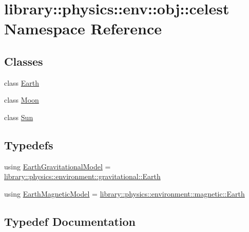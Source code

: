 \hypertarget{namespacelibrary_1_1physics_1_1env_1_1obj_1_1celest}{}\section{library\+:\+:physics\+:\+:env\+:\+:obj\+:\+:celest Namespace Reference}
\label{namespacelibrary_1_1physics_1_1env_1_1obj_1_1celest}
\subsection*{Classes}
\begin{DoxyCompactItemize}
\item 
class \hyperlink{classlibrary_1_1physics_1_1env_1_1obj_1_1celest_1_1_earth}{Earth}
\item 
class \hyperlink{classlibrary_1_1physics_1_1env_1_1obj_1_1celest_1_1_moon}{Moon}
\item 
class \hyperlink{classlibrary_1_1physics_1_1env_1_1obj_1_1celest_1_1_sun}{Sun}
\end{DoxyCompactItemize}
\subsection*{Typedefs}
\begin{DoxyCompactItemize}
\item 
using \hyperlink{namespacelibrary_1_1physics_1_1env_1_1obj_1_1celest_ae5b7a35477a26407f850ec326fb2b2fd}{Earth\+Gravitational\+Model} = \hyperlink{classlibrary_1_1physics_1_1environment_1_1gravitational_1_1_earth}{library\+::physics\+::environment\+::gravitational\+::\+Earth}
\item 
using \hyperlink{namespacelibrary_1_1physics_1_1env_1_1obj_1_1celest_a50039ec894b1106df38eb53bf051b658}{Earth\+Magnetic\+Model} = \hyperlink{classlibrary_1_1physics_1_1environment_1_1magnetic_1_1_earth}{library\+::physics\+::environment\+::magnetic\+::\+Earth}
\end{DoxyCompactItemize}


\subsection{Typedef Documentation}
\mbox{\label{namespacelibrary_1_1physics_1_1env_1_1obj_1_1celest_ae5b7a35477a26407f850ec326fb2b2fd}} 
